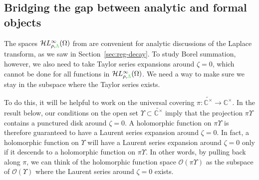 \documentclass{article}
\newcommand{\singexp}[2]{\mathcal{H}L^\infty_{#1, #2}}
\newcommand{\maps}{\colon}
\newcommand{\Z}{\mathbb{Z}}
\newcommand{\R}{\mathbb{R}}
\newcommand{\C}{\mathbb{C}}
\newcommand{\laplacepde}{\mathcal{D}}
\newcommand{\laplace}{\mathcal{L}}
\theoremstyle{definition}
\theoremstyle{plain}
\begin{document}


\subsection{Bridging the gap between analytic and formal objects}
The spaces $\singexp{\rho}{\textcolor{LimeGreen}{\Lambda}}(\Omega)$ from \cite{reg-sing-volterra} are convenient for analytic discussions of the Laplace transform, as we saw in Section~\ref{sec:reg-decay}. To study Borel summation, however, we also need to take Taylor series expansions around $\zeta = 0$, which cannot be done for all functions in $\singexp{\rho}{\textcolor{LimeGreen}{\Lambda}}(\Omega)$. We need a way to make sure we stay in the subspace where the Taylor series exists.

To do this, it will be helpful to work on the universal covering $\pi \maps \widetilde{\C^\times} \to \C^\times$. In the result below, our conditions on the open set $\Upsilon \subset \widetilde{\C^\times}$ imply that the projection $\pi \Upsilon$ contains a punctured disk around $\zeta = 0$. A holomorphic function on $\pi \Upsilon$ is therefore guaranteed to have a Laurent series expansion around $\zeta = 0$. In fact, a holomorphic function on $\Upsilon$ will have a Laurent series expansion around $\zeta = 0$ only if it descends to a holomorphic function on $\pi \Upsilon$. In other words, by pulling back along $\pi$, we can think of the holomorphic function space $\mathcal{O}(\pi \Upsilon)$ as the subspace of $\mathcal{O}(\Upsilon)$ where the Laurent series around $\zeta = 0$ exists.
\end{document}
